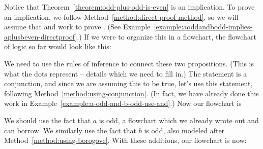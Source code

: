 \documentclass{book}
\theoremstyle{ekimcustom}
\begin{document}
Notice that Theorem~\ref{theorem:odd-plus-odd-is-even} is an implication. To prove an implication, we follow Method~\ref{method:direct-proof-method}, so we will assume that  and work to prove . (See Example~\ref{example:aoddandbodd-implies-aplusbeven-directproof}.) If we were to organize this in a flowchart, the flowchart of logic so far would look like this:
\begin{center}
\end{center}
We need to use the rules of inference to connect these two propositions. (This is what the dots represent -- details which we need to fill in.) The statement  is a conjunction, and since we are assuming this to be true, let's use this statement, following Method~\ref{method:using-conjunction}. (In fact, we have already done this work in Example~\ref{example:a-odd-and-b-odd-use-and}.) Now our flowchart is
\begin{center}
\end{center}
We should use the fact that $a$ is odd, a flowchart which we already wrote out and can borrow. We similarly use the fact that $b$ is odd, also modeled after Method~\ref{method:using-borogove}. With these additions, our flowchart is now:
\begin{center}
\end{center}
\end{document}
